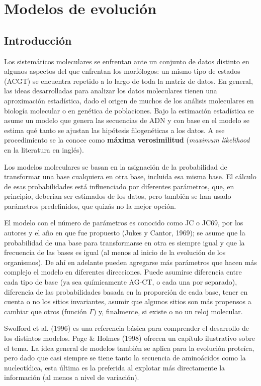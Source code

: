 \chapter{Modelos de evoluci\'on}
\section*{Introducci\'on}
\label{ch:molecular}
Los sistem\'aticos moleculares se enfrentan ante un conjunto de datos distinto en algunos aspectos del que enfrentan los morf\'ologos:  un mismo tipo de estados (ACGT) se encuentra repetido a lo largo de toda la matriz de datos. En general, las ideas desarrolladas para analizar los datos moleculares tienen una aproximaci\'on estad\'istica, dado el origen de muchos de los an\'alisis moleculares en biolog\'ia molecular o en gen\'etica de poblaciones. Bajo la estimaci\'on estad\'istica se asume un modelo que genera las secuencias de ADN y con base en el modelo se estima qu\'e tanto se ajustan las hip\'otesis filogen\'eticas a los datos. A ese procedimiento se la conoce como \textbf{m\'axima verosimilitud} (\textit{maximum likelihood} en la literatura en ingl\'es).

Los modelos moleculares se basan en la asignaci\'on de la probabilidad de transformar una base cualquiera en otra base, incluida esa misma base. El c\'alculo de esas probabilidades est\'a influenciado por diferentes par\'ametros, que, en principio, deber\'ian ser estimados de los datos, pero tambi\'en se han usado par\'ametros predefinidos, que quiz\'as no la mejor opci\'on.

El modelo con el n\'umero de par\'ametros es conocido como JC o JC69, por los autores y el a\~no en que fue propuesto (Jukes y Cantor, 1969); se asume que la probabilidad de una base para transformarse en otra es siempre igual y que la frecuencia de las bases es igual (al menos al inicio de la evoluci\'on de los organismos). De ah\'i en adelante pueden agregarse m\'as par\'ametros que hacen m\'as complejo el modelo en diferentes direcciones. Puede asumirse diferencia entre cada tipo de base (ya sea qu\'imicamente AG-CT, o cada una por separado), diferencia de las probabilidades basada en la proporci\'on de cada base, tener en cuenta o no los sitios invariantes, asumir que algunos sitios son m\'as propensos a cambiar que otros (funci\'on $\Gamma$) y, finalmente, si existe o no un reloj molecular.

Swofford et al. (1996) es una referencia b\'asica para comprender el desarrollo de los distintos modelos. Page \& Holmes (1998) ofrecen un cap\'itulo ilustrativo sobre el tema. La idea general de modelos tambi\'en se aplica para la evoluci\'on prote\'ica, pero dado que casi siempre se tiene tanto la secuencia de amino\'acidos como la nucleot\'idica, esta \'ultima es la preferida al explotar m\'as directamente la informaci\'on (al menos a nivel de variaci\'on).

